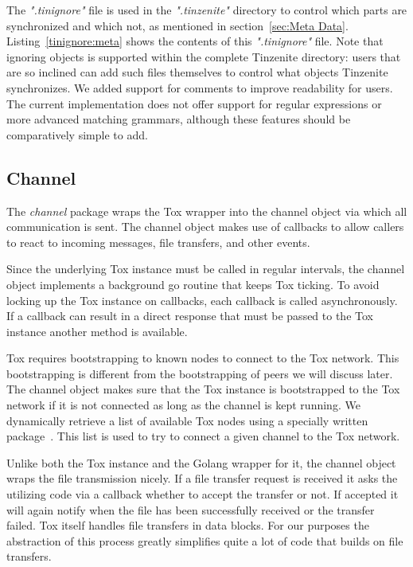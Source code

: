 The \textit{".tinignore"} file is used in the \textit{".tinzenite"} directory to control which parts are synchronized and which not, as mentioned in section~\ref{sec:Meta Data}.
Listing~\ref{tinignore:meta} shows the contents of this \textit{".tinignore"} file.
Note that ignoring objects is supported within the complete Tinzenite directory: users that are so inclined can add such files themselves to control what objects Tinzenite synchronizes.
We added support for comments to improve readability for users.
The current implementation does not offer support for regular expressions or more advanced matching grammars, although these features should be comparatively simple to add.

\subsection{Channel}
\label{sub:Channel}

The \emph{channel} package wraps the Tox wrapper into the channel object via which all communication is sent.
The channel object makes use of callbacks to allow callers to react to incoming messages, file transfers, and other events.

Since the underlying Tox instance must be called in regular intervals, the channel object implements a background go routine that keeps Tox ticking.
To avoid locking up the Tox instance on callbacks, each callback is called asynchronously.
If a callback can result in a direct response that must be passed to the Tox instance another method is available.

Tox requires bootstrapping to known nodes to connect to the Tox network.
This bootstrapping is different from the bootstrapping of peers we will discuss later.
The channel object makes sure that the Tox instance is bootstrapped to the Tox network if it is not connected as long as the channel is kept running.
We dynamically retrieve a list of available Tox nodes using a specially written package~\cite{web:site:github:tox-dynboot}.
This list is used to try to connect a given channel to the Tox network.

Unlike both the Tox instance and the Golang wrapper for it, the channel object wraps the file transmission nicely.
If a file transfer request is received it asks the utilizing code via a callback whether to accept the transfer or not.
If accepted it will again notify when the file has been successfully received or the transfer failed.
Tox itself handles file transfers in data blocks.
For our purposes the abstraction of this process greatly simplifies quite a lot of code that builds on file transfers.

